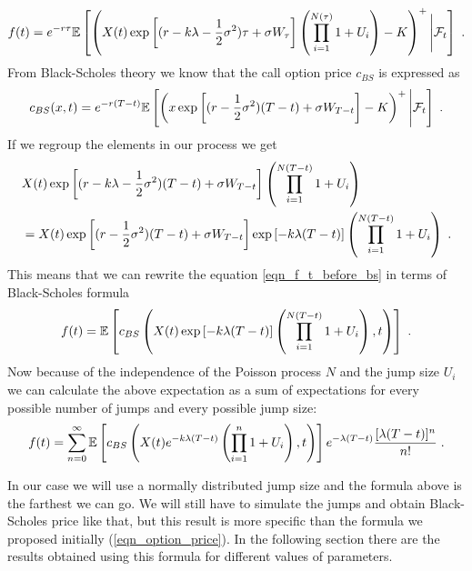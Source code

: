 \documentclass[times, utf8, diplomski]{fer}
\begin{document}
\begin{equation} \label{eqn_f_t_before_bs}
	f(t) = e^{-r\tau} \mathbb{E}\left[\left(X(t)\exp\left[ (r - k\lambda- \frac{1}{2}\sigma^2)\tau + \sigma W_{\tau} \right]\left(\prod_{i=1}^{N(\tau)}1+U_i\right) - K \right)^+\Bigg|\mathcal{F}_t\right]  \hspace{0.1cm}.
\end{equation} From Black-Scholes theory we know that the call option price $c_{BS}$ is expressed as 
\begin{equation*}
	c_{BS}(x,t) = e^{-r(T-t)} \mathbb{E}\left[\left(x\exp\left[ (r - \frac{1}{2}\sigma^2)(T-t) + \sigma W_{T-t} \right] - K \right)^+\Bigg|\mathcal{F}_t\right] \hspace{0.1cm}.
\end{equation*} If we regroup the elements in our process we get 
\begin{align*}
	&X(t)\exp\left[ (r - k\lambda- \frac{1}{2}\sigma^2)(T-t) + \sigma W_{T-t} \right]\left(\prod_{i=1}^{N(T-t)}1+U_i\right) \\
	&= X(t)\exp\left[ (r - \frac{1}{2}\sigma^2)(T-t) + \sigma W_{T-t} \right]\exp\left[ -k\lambda(T-t) \right]\left(\prod_{i=1}^{N(T-t)}1+U_i\right) \hspace{0.1cm}.
\end{align*} This means that we can rewrite the equation \ref{eqn_f_t_before_bs} in terms of Black-Scholes formula
\begin{equation}
	f(t) = \mathbb{E}\left[c_{BS}\left(X(t)\exp\left[ -k\lambda(T-t) \right]\left(\prod_{i=1}^{N(T-t)}1+U_i\right), t\right)\right] \hspace{0.1cm}.
\end{equation} Now because of the independence of the Poisson process $N$ and the jump size $U_i$ we can calculate the above expectation as a sum of expectations for every possible number of jumps and every possible jump size:
\begin{equation}
	f(t) = \sum_{n=0}^{\infty}\mathbb{E}\left[c_{BS}\left(X(t)e^{-k\lambda(T-t)}\left(\prod_{i=1}^{n}1+U_i\right), t\right)\right]e^{-\lambda(T-t)}\frac{[\lambda(T-t)]^n}{n!} \hspace{0.1cm}.
\end{equation}

\noindent In our case we will use a normally distributed jump size and the formula above is the farthest we can go. We will still have to simulate the jumps and obtain Black-Scholes price like that, but this result is more specific than the formula we proposed initially (\ref{eqn_option_price}). In the following section there are the results obtained using this formula for different values of parameters.
\end{document}
